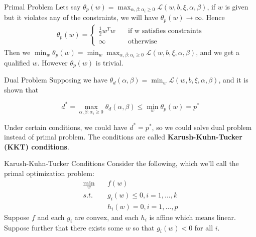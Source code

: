 \documentclass{beamer}
\begin{document}
\begin{frame}{Primal Problem}
Lets say $\theta_{p}(w) = \max_{\alpha,\beta: \alpha_i \geq 0} \mathcal{L} (w, b, \xi, \alpha, \beta)$, if $w$ is given but it violates any of the constraints, we will have $\theta_{p}(w) \rightarrow \infty $. Hence 
\begin{gather*}
\theta_{p}(w) = 
\begin{cases}
\frac{1}{2}w^T w \quad &\text{if w satisfies constraints} \\
\infty \quad &\text{otherwise}
\end{cases}
\end{gather*}
Then we $\min_w{\theta_{p}(w)} = \min_w{\max_{\alpha,\beta: \alpha_i \geq 0} \mathcal{L}(w, b, \xi, \alpha, \beta)} $, and we get a qualified $w$.
However $\theta_{p}(w)$ is trivial. 
\end{frame}

\begin{frame}{Dual Problem}
Supposing we have $\theta_d(\alpha, \beta) = \min_{w}\mathcal{L}(w, b, \xi, \alpha, \beta)$, and it is shown that 

$$
d^* = \max_{\alpha,\beta: \alpha_i \geq 0} \theta_d(\alpha, \beta) \leq \min_w{\theta_{p}(w)} = p^*
$$

Under certain conditions, we could have $d^* = p^*$, so we could solve dual problem instead of primal problem. The conditions are called \textbf{Karush-Kuhn-Tucker (KKT) conditions}.
\end{frame}

\begin{frame}{Karush-Kuhn-Tucker Conditions}
Consider the following, which we’ll call the primal optimization problem:
\begin{align*}
    \min_{w} \quad &f(w) \\
    s.t. \quad &g_i(w) \leq 0, i = 1, \dots ,k \\
    &h_i(w) = 0, i = 1, \dots , p
\end{align*}
Suppose $f$ and each $g_i$ are convex, and each $h_i$ is affine which means linear. Suppose further that there exists some $w$ so that $g_i(w) < 0$ for all $i$. \\
\end{frame}
\end{document}
